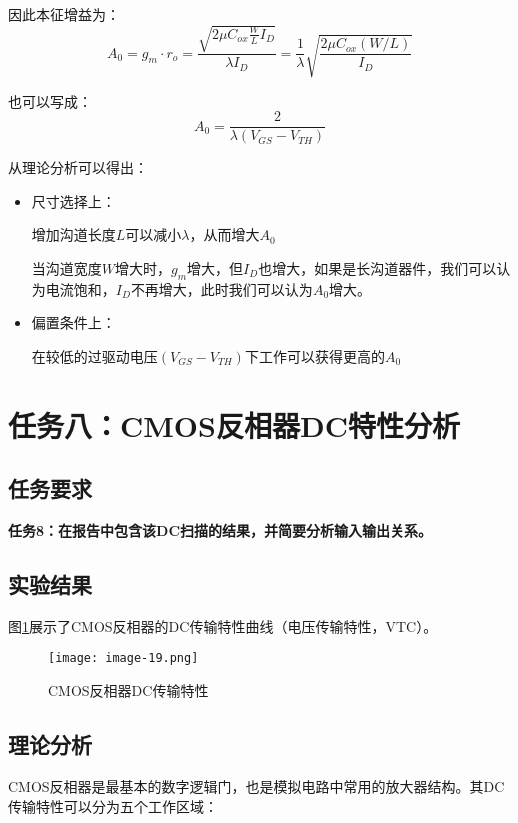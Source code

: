 \documentclass[UTF8,12pt,a4paper]{ctexart}
\begin{document}
因此本征增益为：
\begin{equation}
A_0 = g_m \cdot r_o = \frac{\sqrt{2\mu C_{ox}\frac{W}{L}I_D}}{\lambda I_D} = \frac{1}{\lambda}\sqrt{\frac{2\mu C_{ox}(W/L)}{I_D}}
\end{equation}

也可以写成：
\begin{equation}
A_0 = \frac{2}{\lambda(V_{GS}-V_{TH})}
\end{equation}

从理论分析可以得出：
\begin{itemize}
\item 尺寸选择上：

增加沟道长度$L$可以减小$\lambda$，从而增大$A_0$

当沟道宽度$W$增大时，$g_m$增大，但$I_D$也增大，如果是长沟道器件，我们可以认为电流饱和，$I_D$不再增大，此时我们可以认为$A_0$增大。

\item 偏置条件上：

在较低的过驱动电压$(V_{GS}-V_{TH})$下工作可以获得更高的$A_0$
\end{itemize}


\newpage
\section{任务八：CMOS反相器DC特性分析}

\subsection{任务要求}
\textbf{任务8：在报告中包含该DC扫描的结果，并简要分析输入输出关系。}

\subsection{实验结果}
图\ref{fig:task8}展示了CMOS反相器的DC传输特性曲线（电压传输特性，VTC）。

\begin{figure}[h]
\centering
\texttt{[image: image-19.png]}
\caption{CMOS反相器DC传输特性}
\label{fig:task8}
\end{figure}

\subsection{理论分析}
CMOS反相器是最基本的数字逻辑门，也是模拟电路中常用的放大器结构。其DC传输特性可以分为五个工作区域：
\end{document}
